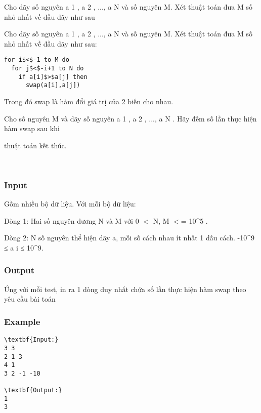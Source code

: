

Cho dãy số nguyên a 1 , a 2 , ..., a N và số nguyên M. Xét thuật toán đưa M số nhỏ nhất về đầu dãy như sau

Cho dãy số nguyên a 1 , a 2 , ..., a N và số nguyên M. Xét thuật toán đưa M số nhỏ nhất về đầu dãy như sau:
\begin{verbatim}
for i$<$-1 to M do
  for j$<$-i+1 to N do
    if a[i]$>$a[j] then
      swap(a[i],a[j])\end{verbatim}

Trong đó swap là hàm đổi giá trị của 2 biến cho nhau.

Cho số nguyên M và dãy số nguyên a 1 , a 2 , ..., a N . Hãy đếm số lần thực hiện hàm swap sau khi

thuật toán kết thúc.

 

\subsubsection{Input}

Gồm nhiều bộ dữ liệu. Với mỗi bộ dữ liệu:

Dòng 1: Hai số nguyên dương N và M với 0 $<$ N, M $<$= 10\textasciicircum5 .

Dòng 2: N số nguyên thể hiện dãy a, mỗi số cách nhau ít nhất 1 dấu cách. -10\textasciicircum9 ≤ a i ≤ 10\textasciicircum9.

\subsubsection{Output}

Ứng với mỗi test, in ra 1 dòng duy nhất chứa số lần thực hiện hàm swap theo yêu cầu bài toán

\subsubsection{Example}
\begin{verbatim}
\textbf{Input:}
3 3
2 1 3
4 1
3 2 -1 -10

\textbf{Output:}
1
3\end{verbatim}